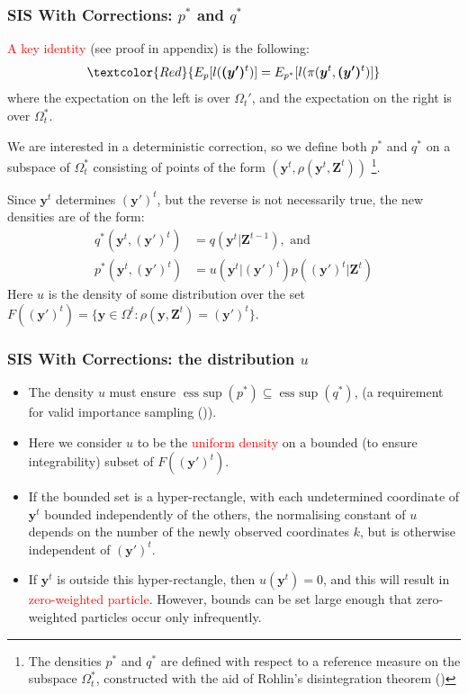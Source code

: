 \documentclass[9pt, xcolor={dvipsnames,svgnames,table}]{beamer}
\DeclareMathOperator*{\esssupp}{ess~sup}
\begin{document}
\begin{frame}
    \frametitle{SIS With Corrections: $p^*$ and $q^*$} \label{identity}
    \textcolor{Red}{A key identity} (see proof in appendix) is the following:
    \begin{equation*}
        \textcolor{Red}{E_{p}[l(\bm{(y')}^{t})]  =  E_{p^*}[l(\pi (\bm{y}^{t}, \bm{(y')}^{t})]}
    \end{equation*}
    where the expectation on the left is over $\Omega_t'$, and the expectation on the right is over $\Omega_t^*$.
    
    We are interested in a \textcolor{PineGreen}{deterministic correction}, so we define both $p^*$ and $q^*$ on a subspace of $\Omega_t^*$ consisting of points of the form \textcolor{PineGreen}{$(\bm{y}^{t}, \rho(\bm{y}^{t}, \bm{Z}^{t}))$} \footnote{The densities $p^*$ and $q^*$ are defined with respect to a reference measure on the subspace $\Omega_t^*$, constructed with the aid of Rohlin's disintegration theorem (\cite{Rohlin})}.
    
    Since $\bm{y}^{t}$ determines $\bm{(y')}^{t}$, but the reverse is not necessarily true, the new densities are of the form:
    \begin{align*}
        q^*(\bm{y}^{t},\bm{(y')}^{t}) &= q(\bm{y}^{t} | \bm{Z}^{t-1}), \mbox{ and } \\
        p^*(\bm{y}^{t},\bm{(y')}^{t}) &= u(\bm{y}^{t} | \bm{(y')}^{t}) p(\bm{(y')}^{t} | \bm{Z}^{t})
    \end{align*}
   Here \textcolor{PineGreen}{$u$ is the density of some distribution over the set $F(\bm{(y')}^{t}) = \{ \bm{y} \in \Omega^t  :  \rho(\bm{y}, \bm{Z}^{t}) = \bm{(y')}^{t}\}$}.
\end{frame}





\begin{frame}
    \frametitle{SIS With Corrections: the distribution $u$}
    \begin{itemize}
        \item The density $u$ must ensure $\esssupp(p^*) \subseteq \esssupp(q^*)$, (a requirement for valid importance sampling (\cite{Geweke})).
        \item Here we consider $u$ to be the \textcolor{Red}{uniform density} on a bounded (to ensure integrability) subset of $F(\bm{(y')}^{t})$.
        \item If the bounded set is a hyper-rectangle, with each undetermined coordinate of $\bm{y}^{t}$ bounded independently of the others, the normalising constant of $u$ depends on the number of the newly observed coordinates $k$, but is otherwise independent of $\bm{(y')}^{t}$.
        \item If $\bm{y}^t$ is outside this hyper-rectangle, then $u(\bm{y}^t) = 0$, and this will result in \textcolor{Red}{zero-weighted particle}. However, bounds can be set large enough that zero-weighted particles occur only infrequently.
    \end{itemize}
\end{frame}
\end{document}
